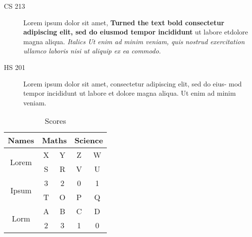 \documentclass{article}
\begin{document}
\begin{description}
\item[CS 213] Lorem ipsum dolor sit amet, \textbf{Turned the text bold consectetur adipiscing elit, sed do eiusmod tempor incididunt} ut labore etdolore magna aliqua. \textit{   Italics Ut enim ad minim veniam, quis nostrud exercitation ullamco laboris nisi ut aliquip ex ea commodo.}
\end{description}
\begin{description}
\item[HS 201] Lorem ipsum dolor sit amet, consectetur adipiscing elit, sed do eius-
mod tempor incididunt ut labore et dolore magna aliqua. Ut enim ad
minim veniam.
\end{description}

\newpage
{\pagecolor{green} %
\begin{table}[h!]
    \centering %
    \begin{tabular}{|c|c|c|c|c|}
    \hline
    Names & \multicolumn{2}{|c|}{Maths} & \multicolumn{2}{|c|}{Science} \\
    \hline
    \multirow{2}{*}{Lorem} & X & Y & Z & W \\
    \hhline{|~|-|-|-|-|}
      & S & R & V & U \\
    \hline
    \multirow{2}{*}{Ipsum} & 3 & 2 & 0 & 1 \\
    \hhline{|~|-|-|-|-|}
      & T & O & P & Q \\
      \hline
    \multirow{2}{*}{Lorm} & A & B & C & D \\
    \hhline{|~|-|-|-|-|}
      & 2 & 3 & 1 & 0 \\
      \hline
    \end{tabular}
    
    \caption{Scores}%
    \label{tab: scores}%
\end{table}
}
\end{document}

